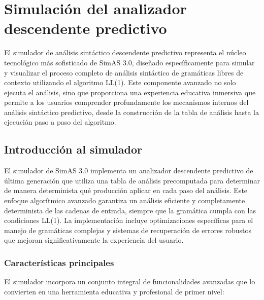 \chapter{Simulación del analizador descendente predictivo}

El simulador de análisis sintáctico descendente predictivo representa el núcleo tecnológico más sofisticado de SimAS 3.0, diseñado específicamente para simular y visualizar el proceso completo de análisis sintáctico de gramáticas libres de contexto utilizando el algoritmo LL(1). Este componente avanzado no solo ejecuta el análisis, sino que proporciona una experiencia educativa inmersiva que permite a los usuarios comprender profundamente los mecanismos internos del análisis sintáctico predictivo, desde la construcción de la tabla de análisis hasta la ejecución paso a paso del algoritmo.

\section{Introducción al simulador}

El simulador de SimAS 3.0 implementa un analizador descendente predictivo de última generación que utiliza una tabla de análisis precomputada para determinar de manera determinista qué producción aplicar en cada paso del análisis. Este enfoque algorítmico avanzado garantiza un análisis eficiente y completamente determinista de las cadenas de entrada, siempre que la gramática cumpla con las condiciones LL(1). La implementación incluye optimizaciones específicas para el manejo de gramáticas complejas y sistemas de recuperación de errores robustos que mejoran significativamente la experiencia del usuario.

\subsection{Características principales}

El simulador incorpora un conjunto integral de funcionalidades avanzadas que lo convierten en una herramienta educativa y profesional de primer nivel:

